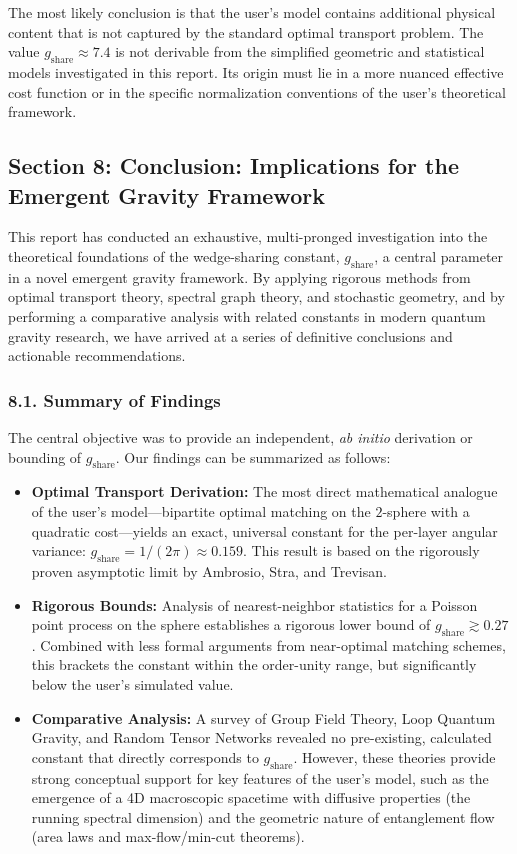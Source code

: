 \documentclass[11pt]{article}
\begin{document}
The most likely conclusion is that the user’s model contains additional physical content that is not captured by the standard optimal transport problem. The value $g_{\mathrm{share}} \approx 7.4$ is not derivable from the simplified geometric and statistical models investigated in this report. Its origin must lie in a more nuanced effective cost function or in the specific normalization conventions of the user’s theoretical framework.

\subsection*{Section 8: Conclusion: Implications for the Emergent Gravity Framework}
This report has conducted an exhaustive, multi-pronged investigation into the theoretical foundations of the wedge-sharing constant, $g_{\mathrm{share}}$, a central parameter in a novel emergent gravity framework. By applying rigorous methods from optimal transport theory, spectral graph theory, and stochastic geometry, and by performing a comparative analysis with related constants in modern quantum gravity research, we have arrived at a series of definitive conclusions and actionable recommendations.

\subsubsection*{8.1. Summary of Findings}
The central objective was to provide an independent, \emph{ab initio} derivation or bounding of $g_{\mathrm{share}}$. Our findings can be summarized as follows:
\begin{itemize}
  \item \textbf{Optimal Transport Derivation:} The most direct mathematical analogue of the user’s model—bipartite optimal matching on the $2$-sphere with a quadratic cost—yields an exact, universal constant for the per-layer angular variance: $g_{\mathrm{share}} = 1/(2\pi) \approx 0.159$. This result is based on the rigorously proven asymptotic limit by Ambrosio, Stra, and Trevisan.
  \item \textbf{Rigorous Bounds:} Analysis of nearest-neighbor statistics for a Poisson point process on the sphere establishes a rigorous lower bound of $g_{\mathrm{share}} \gtrsim 0.27$. Combined with less formal arguments from near-optimal matching schemes, this brackets the constant within the order-unity range, but significantly below the user’s simulated value.
  \item \textbf{Comparative Analysis:} A survey of Group Field Theory, Loop Quantum Gravity, and Random Tensor Networks revealed no pre-existing, calculated constant that directly corresponds to $g_{\mathrm{share}}$. However, these theories provide strong conceptual support for key features of the user’s model, such as the emergence of a 4D macroscopic spacetime with diffusive properties (the running spectral dimension) and the geometric nature of entanglement flow (area laws and max-flow/min-cut theorems).
\end{itemize}
\end{document}
